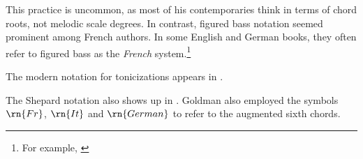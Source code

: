 
This practice is uncommon, as most of his contemporaries
think in terms of chord roots, not melodic scale degrees. In
contrast, figured bass notation seemed prominent among
French authors. In some English and German books, they often
refer to figured bass as the \emph{French}
system.\footnote{For example,
\textcite{norris1894practical}}

The modern notation for tonicizations appears in
\textcite{tischler1964practical}.

The Shepard notation also shows up in
\textcite{goldman1965harmony}. Goldman also employed the
symbols $\rn{Fr}$, $\rn{It}$ and $\rn{German}$ to refer to
the augmented sixth chords.
